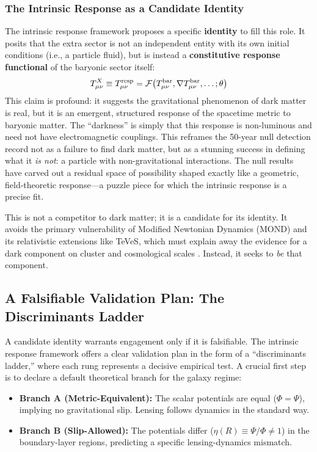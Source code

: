 \documentclass[12pt,onecolumn]{aastex631}
\newcommand{\tresp}{T^{\rm resp}_{\mu\nu}}
\newcommand{\tbar}{T^{\rm bar}_{\mu\nu}}
\newcommand{\gx}{T^{X}_{\mu\nu}}
\begin{document}
\subsubsection{The Intrinsic Response as a Candidate Identity}
The intrinsic response framework proposes a specific \textbf{identity} to fill this role. It posits that the extra sector is not an independent entity with its own initial conditions (i.e., a particle fluid), but is instead a \textbf{constitutive response functional} of the baryonic sector itself:
\begin{equation}
\gx \equiv \tresp = \mathcal{F}\!\left(\tbar, \nabla \tbar, \ldots;\theta\right)
\end{equation}
This claim is profound: it suggests the gravitational phenomenon of dark matter is real, but it is an emergent, structured response of the spacetime metric to baryonic matter. The “darkness” is simply that this response is non-luminous and need not have electromagnetic couplings. This reframes the 50-year null detection record not as a failure to find dark matter, but as a stunning success in defining what it \textit{is not}: a particle with non-gravitational interactions. The null results have carved out a residual space of possibility shaped exactly like a geometric, field-theoretic response—a puzzle piece for which the intrinsic response is a precise fit.

This is not a competitor to dark matter; it is a candidate for its identity. It avoids the primary vulnerability of Modified Newtonian Dynamics (MOND) and its relativistic extensions like TeVeS, which must explain away the evidence for a dark component on cluster and cosmological scales \citep{Milgrom1983, Bekenstein2004}. Instead, it seeks to \textit{be} that component.

\subsection{A Falsifiable Validation Plan: The Discriminants Ladder}
A candidate identity warrants engagement only if it is falsifiable. The intrinsic response framework offers a clear validation plan in the form of a “discriminants ladder,” where each rung represents a decisive empirical test. A crucial first step is to declare a default theoretical branch for the galaxy regime:

\begin{itemize}
    \item \textbf{Branch A (Metric-Equivalent):} The scalar potentials are equal (\(\Phi=\Psi\)), implying no gravitational slip. Lensing follows dynamics in the standard way.
    \item \textbf{Branch B (Slip-Allowed):} The potentials differ (\(\eta(R)\equiv\Psi/\Phi\neq 1\)) in the boundary-layer regions, predicting a specific lensing-dynamics mismatch.
\end{itemize}
\end{document}
